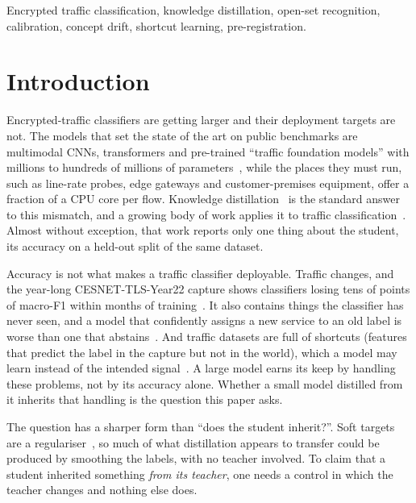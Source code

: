 \documentclass[journal]{IEEEtran}
\begin{document}
\begin{IEEEkeywords}
Encrypted traffic classification, knowledge distillation, open-set recognition, calibration, concept drift, shortcut learning, pre-registration.
\end{IEEEkeywords}

\IEEEpeerreviewmaketitle

\section{Introduction}

Encrypted-traffic classifiers are getting larger and their deployment targets are not. The models that set the state of the art on public benchmarks are multimodal CNNs, transformers and pre-trained ``traffic foundation models'' with millions to hundreds of millions of parameters~\cite{luxemburk2024year22,etbert,yatc,netfound}, while the places they must run, such as line-rate probes, edge gateways and customer-premises equipment, offer a fraction of a CPU core per flow. Knowledge distillation~\cite{hinton2015} is the standard answer to this mismatch, and a growing body of work applies it to traffic classification~\cite{netclus,merlot,resaware,ciphersight,tnsm2026fedkd}. Almost without exception, that work reports only one thing about the student, its accuracy on a held-out split of the same dataset.

Accuracy is not what makes a traffic classifier deployable. Traffic changes, and the year-long CESNET-TLS-Year22 capture shows classifiers losing tens of points of macro-F1 within months of training~\cite{luxemburk2024year22,ntccrisis}. It also contains things the classifier has never seen, and a model that confidently assigns a new service to an old label is worse than one that abstains~\cite{luxemburk2022reject}. And traffic datasets are full of shortcuts (features that predict the label in the capture but not in the world), which a model may learn instead of the intended signal~\cite{biasseeker}. A large model earns its keep by handling these problems, not by its accuracy alone. Whether a small model distilled from it inherits that handling is the question this paper asks.

The question has a sharper form than ``does the student inherit?''. Soft targets are a regulariser~\cite{yuan2020revisiting,functionalkd}, so much of what distillation appears to transfer could be produced by smoothing the labels, with no teacher involved. To claim that a student inherited something \emph{from its teacher}, one needs a control in which the teacher changes and nothing else does.
\end{document}

